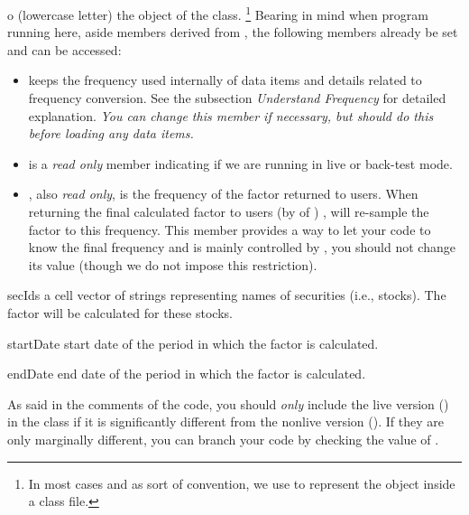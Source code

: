        \begin{argdesc}
          \item [o] (lowercase letter) the object of the class.
                \footnote{In most cases and as sort of convention, we use  to represent the object inside a class file.}
                Bearing in mind when program running here, aside members derived from \myfints{},
                the following members already be set and can be accessed:
                \begin{itemize}
                   \item {} keeps the frequency used internally of data items 
                         and details related to frequency conversion. 
                         See the subsection \emph{Understand Frequency} for detailed explanation.
                         \emph{You can \emph{change} this member if necessary, 
                         but should do this before loading any data items.}
                   \item {} is a \emph{read only} member 
                         indicating if we are running in live or back-test mode.
                   \item {}, also \emph{read only}, 
                         is the frequency of the factor returned to users.
                         When returning the final calculated factor to users (by  of ) , 
                          will re-sample the factor to this frequency.
                         This member provides a way to let your code to know the final frequency 
                         and is mainly controlled by , 
                         you should not change its value (though we do not impose this restriction).
                \end{itemize}

          \item [secIds] a cell vector of strings representing names of securities (i.e., stocks).
                The factor will be calculated for these stocks.

          \item [startDate] start date of the period in which the factor is calculated.
          \item [endDate] end date of the period in which the factor is calculated.
       \end{argdesc}
       As said in the comments of the code, 
       you should \emph{only} include the live version () in the class
       if it is significantly different from the nonlive version ().
       If they are only marginally different, 
       you can branch your code by checking the value of .

